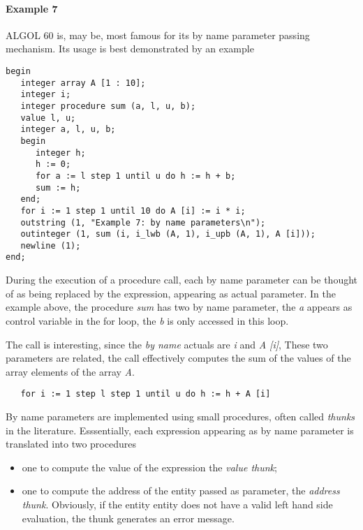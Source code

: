 \documentclass[11pt]{article}
\begin{document}
\paragraph{Example 7}
ALGOL 60 is, may be, most famous for its by name parameter passing mechanism.
Its usage is best demonstrated by an example
{\footnotesize
\begin{verbatim}
begin
   integer array A [1 : 10];
   integer i;
   integer procedure sum (a, l, u, b);
   value l, u;
   integer a, l, u, b;
   begin
      integer h;
      h := 0;
      for a := l step 1 until u do h := h + b;
      sum := h;
   end;
   for i := 1 step 1 until 10 do A [i] := i * i;
   outstring (1, "Example 7: by name parameters\n");
   outinteger (1, sum (i, i_lwb (A, 1), i_upb (A, 1), A [i]));
   newline (1);
end;
\end{verbatim}
}
During the execution of a procedure call, each by name parameter can be thought of as being
replaced by the expression, appearing as actual parameter.
In the example above, the procedure {\em sum} has two by name parameter,
the {\em a} appears as control variable in the for loop,
the {\em b} is only accessed in this loop.

The call is interesting, since the {\em by name} actuals are {\em i}
and {\em A [i]}, These two parameters are related,
the call effectively computes
the sum of the values of the array elements of the array {\em A}.
{\footnotesize
\begin{verbatim}
   for i := 1 step l step 1 until u do h := h + A [i]
\end{verbatim}
}
By name parameters are implemented using small procedures, often called 
{\em thunks} in the literature. Esssentially, each
expression appearing as by name parameter is translated into two procedures
\begin{itemize}
\item one to compute the value of the expression the {\em value thunk};
\item one to compute the address of the entity passed as parameter,
the {\em address thunk}. Obviously, if the entity
entity does not have a valid left hand side evaluation, the thunk
generates an error message.
\end{itemize}
\end{document}
